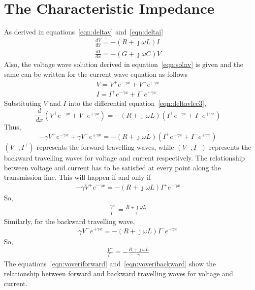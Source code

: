 \section{The Characteristic Impedance}
As derived in equations~\eqref{eqn:deltav} and~\eqref{eqn:deltai}
\begin{align}
\frac{dV}{dx} = -(R+\jmath\omega L)I\label{eqn:deltavlec3}\\
\frac{dI}{dx} = -(G+\jmath\omega C)V\label{en:deltavlec3}
\end{align}
Also, the voltage wave solution derived in equation~\eqref{eqn:solnv} is given and the same can be written for the current wave equation as follows
\begin{align*}
V = V^+e^{-\gamma x}+V^-e^{+\gamma x}\\
I = I^+e^{-\gamma x}+I^-e^{+\gamma x}
\end{align*}
Substituting $V$ and $I$ into the differential equation~\eqref{eqn:deltavlec3},
\[
\frac{d}{dx}(V^+e^{-\gamma x}+V^-e^{+\gamma x}) = -(R+\jmath\omega L)(I^+e^{-\gamma x}+I^-e^{+\gamma x})
\]
Thus,
\[
-\gamma V^+e^{-\gamma x}+\gamma V^-e^{+\gamma x} = -(R+\jmath\omega L)(I^+e^{-\gamma x}+I^-e^{+\gamma x})
\]
$(V^+,I^+)$ represents the forward travelling waves, while $(V^-,I^-)$ represents the backward travelling waves for voltage and current respectively. The relationship between voltage and current has to be satisfied at every point along the transmission line. This will happen if and only if
\begin{align*}
-\gamma V^+e^{-\gamma x} = -(R+\jmath\omega L)I^+e^{-\gamma x}
\end{align*}
So,
\begin{align}
\frac{V^+}{I^+} = \frac{R+\jmath\omega L}{\gamma}
\label{eqn:voveriforward}
\end{align}
Similarly, for the backward travelling wave, 
\begin{align*}
\gamma V^-e^{+\gamma x} = -(R+\jmath\omega L)I^-e^{+\gamma x}
\end{align*}
So,
\begin{align}
\frac{V^-}{I^-} = -\frac{R+\jmath\omega L}{\gamma}
\label{eqn:voveribackward}
\end{align}
The equations~\eqref{eqn:voveriforward} and~\eqref{eqn:voveribackward} show the relationship between forward and backward travelling waves for voltage and current.

